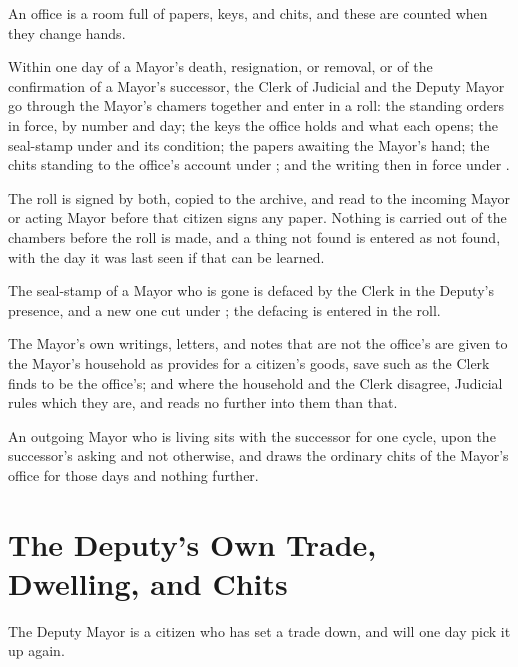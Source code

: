 An office is a room full of papers, keys, and chits, and these are counted when they change hands.

\begin{clauses}
\item Within one day of a Mayor's death, resignation, or removal, or of the confirmation of a Mayor's successor, the Clerk of Judicial and the Deputy Mayor go through the Mayor's chamers together and enter in a roll: the standing orders in force, by number and day; the keys the office holds and what each opens; the seal-stamp under  and its condition; the papers awaiting the Mayor's hand; the chits standing to the office's account under ; and the writing then in force under .
\item The roll is signed by both, copied to the archive, and read to the incoming Mayor or acting Mayor before that citizen signs any paper. Nothing is carried out of the chambers before the roll is made, and a thing not found is entered as not found, with the day it was last seen if that can be learned.
\item The seal-stamp of a Mayor who is gone is defaced by the Clerk in the Deputy's presence, and a new one cut under ; the defacing is entered in the roll.
\item The Mayor's own writings, letters, and notes that are not the office's are given to the Mayor's household as  provides for a citizen's goods, save such as the Clerk finds to be the office's; and where the household and the Clerk disagree, Judicial rules which they are, and reads no further into them than that.
\item An outgoing Mayor who is living sits with the successor for one cycle, upon the successor's asking and not otherwise, and draws the ordinary chits of the Mayor's office for those days and nothing further.
\end{clauses}

\section{The Deputy's Own Trade, Dwelling, and Chits}
\label{sec:succession:deputys-own-trade-dwelling-and-chits}

The Deputy Mayor is a citizen who has set a trade down, and will one day pick it up again.

